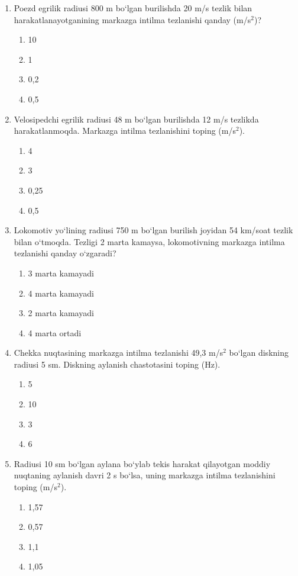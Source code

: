 \begin{enumerate}
\item Poezd egrilik radiusi 800 m bo‘lgan burilishda 20 m/s tezlik bilan harakatlanayotganining markazga intilma tezlanishi qanday (m/s$^2$)?
\begin{enumerate}[label=\Alph*)]
\item 10
\item 1
\item 0,2
\item 0,5
\end{enumerate}

\item Velosipedchi egrilik radiusi 48 m bo‘lgan burilishda 12 m/s tezlikda harakatlanmoqda. Markazga intilma tezlanishini toping (m/s$^2$).
\begin{enumerate}[label=\Alph*)]
\item 4
\item 3
\item 0,25
\item 0,5
\end{enumerate}

\item Lokomotiv yo‘lining radiusi 750 m bo‘lgan burilish joyidan 54 km/soat tezlik bilan o‘tmoqda. Tezligi 2 marta kamaysa, lokomotivning markazga intilma tezlanishi qanday o‘zgaradi?
\begin{enumerate}[label=\Alph*)]
\item 3 marta kamayadi
\item 4 marta kamayadi
\item 2 marta kamayadi
\item 4 marta ortadi
\end{enumerate}

\item Chekka nuqtasining markazga intilma tezlanishi 49,3 m/s$^2$ bo‘lgan diskning radiusi 5 sm. Diskning aylanish chastotasini toping (Hz).
\begin{enumerate}[label=\Alph*)]
\item 5
\item 10
\item 3
\item 6
\end{enumerate}

\item Radiusi 10 sm bo‘lgan aylana bo‘ylab tekis harakat qilayotgan moddiy nuqtaning aylanish davri 2 s bo‘lsa, uning markazga intilma tezlanishini toping (m/s$^2$).
\begin{enumerate}[label=\Alph*)]
\item 1,57
\item 0,57
\item 1,1
\item 1,05
\end{enumerate}


\end{enumerate}
